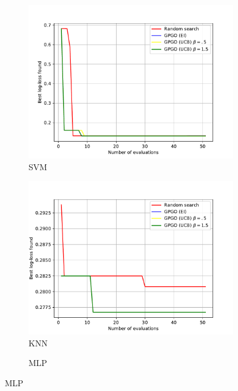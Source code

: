 \documentclass[10pt,a4paper,twoside]{book}
\begin{document}
\begin{figure}[ht]
  \centering
  \caption{Benchmarking results for the breast cancer dataset.}
  \begin{subfigure}[t]{0.5\textwidth}
  	\caption{SVM}
    \centering\includegraphics[width=\textwidth]{figures/chapter4/breast/svm}
  \end{subfigure}%
  \begin{subfigure}[t]{0.5\textwidth}
    \caption{KNN}
    \centering\includegraphics[width=\textwidth]{figures/chapter4/breast/knn}
  \end{subfigure}
    \begin{subfigure}[t]{0.5\textwidth}
    \caption{MLP}

\end{subfigure}
\end{figure}
\end{document}
